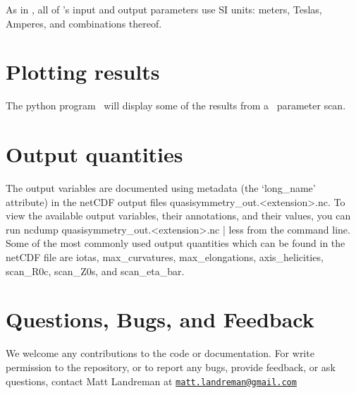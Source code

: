 As in \vmec, all of \quasisymmetry's input and output parameters use SI units: meters, Teslas, Amperes, and combinations thereof.

\section{Plotting results}

The python program \quasisymmetryPlot~will display some of the results from a \quasisymmetry~parameter scan.

\section{Output quantities}

The output variables are documented using metadata (the `{\ttfamily long\_name}' attribute)
in the netCDF output files {\ttfamily quasisymmetry\_out.<extension>.nc}.
To view the available output variables, their annotations, and their values, you can run
{\ttfamily ncdump quasisymmetry\_out.<extension>.nc | less} from the command line.
Some of the most commonly used output quantities which can be found in the netCDF file are 
{\ttfamily iotas},
{\ttfamily max\_curvatures},
{\ttfamily max\_elongations},
{\ttfamily axis\_helicities},
{\ttfamily scan\_R0c},
{\ttfamily scan\_Z0s},
and
{\ttfamily scan\_eta\_bar}.

\section{Questions, Bugs, and Feedback}

We welcome any contributions to the code or documentation.
For write permission to the repository, or to report any bugs, provide feedback, or ask questions, contact Matt Landreman at
\href{mailto:matt.landreman@gmail.com}{\nolinkurl{matt.landreman@gmail.com} }






